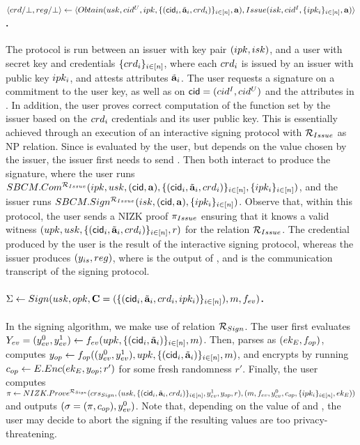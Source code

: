 \paragraph{$\langle crd/\bot,reg/\bot \rangle \gets
  \langle Obtain(usk,cid^U,ipk,\lbrace (\mathsf{cid}_i,\tilde{\mathbf{a}}_i,crd_i) \rbrace_{i\in[n]},
  \mathbf{a}),Issue(isk,cid^I,\lbrace ipk_i \rbrace_{i\in[n]},\mathbf{a})\rangle$.} %
The protocol is run between an issuer with key pair $(ipk,isk)$, and a user
with secret key \usk and credentials $\lbrace crd_i \rbrace_{i\in[n]}$, where
each $crd_i$ is issued by an issuer with public key $ipk_i$, and
attests attributes $\tilde{\mathbf{a}}_i$. The user requests a signature on a commitment to
the user key, as well as on $\mathsf{cid}=(cid^I,cid^U)$ and the attributes in \attrs.
In addition, the user proves correct computation of the \fissue function set by
the issuer based on the $crd_i$ credentials and its user public key.
This is essentially achieved through an execution of an \SBCM interactive
signing protocol with $\mathcal{R}_{Issue}$ as NP relation. Since \fissue is
evaluated by the user, but depends on the \cidi value chosen by the issuer, the
issuer first needs to send \cidi.
Then both interact to produce the \SBCM signature, where the
user runs $SBCM.Com^{\mathcal{R}_{Issue}}(ipk,usk,(\mathsf{cid},\mathbf{a}),\lbrace (\mathsf{cid}_i,
\tilde{\mathbf{a}}_i,crd_i)\rbrace_{i\in[n]},\lbrace ipk_i \rbrace_{i\in[n]})$, and the
issuer runs $SBCM.Sign^{\mathcal{R}_{Issue}}(isk,(\mathsf{cid},\mathbf{a}),\lbrace ipk_i
\rbrace_{i\in[n]})$. Observe that, within this protocol, the user sends a NIZK
proof $\pi_{Issue}$ ensuring that it knows a valid witness $(upk,usk,
\lbrace (\mathsf{cid}_i,\tilde{\mathbf{a}}_i,crd_i)\rbrace_{i \in [n]},r)$ for the relation
$\mathcal{R}_{Issue}$. The credential \cred produced by the user is the result of
the interactive signing protocol, whereas the issuer produces $(y_{is},
reg)$, where \yissue is the output of \fissue, and \utrans is the
communication transcript of the signing protocol.%

\paragraph{$\Sigma \gets Sign(usk,opk,
  \mathbf{C}=(\lbrace (\mathsf{cid}_i,\tilde{\mathbf{a}}_i,crd_i,ipk_i)\rbrace_{i\in[n]}),
  m,f_{ev})$.} %
In the signing algorithm, we make use of relation $\mathcal{R}_{Sign}$.
% 
The user first evaluates $Y_{ev} = (y_{ev}^0,y_{ev}^1) \gets f_{ev} (upk,
\lbrace(\mathsf{cid}_i,\tilde{\mathbf{a}}_i)\rbrace_{i\in[n]},m)$. Then, parses \opk as $(ek_{E},
f_{op})$, computes $y_{op} \gets f_{op}((y_{ev}^0,y_{ev}^1),upk,
\lbrace(\mathsf{cid}_i,\tilde{\mathbf{a}}_i)\rbrace_{i\in[n]},m)$, and encrypts
\yinsp by running $c_{op} \gets E.Enc(ek_{E},y_{op}; r')$ for some fresh
randomness $r'$. Finally, the user
computes $\pi \gets NIZK.Prove^{\mathcal{R}_{Sign}}(crs_{Sign},(usk,
\lbrace(\mathsf{cid}_i,\tilde{\mathbf{a}}_i,crd_i)\rbrace_{i\in[n]},y_{ev}^1,y_{op},r),(m,
f_{ev},y_{ev}^0,c_{op},\lbrace ipk_i\rbrace_{i\in[n]},ek_{E}))$ and outputs
$(\sigma = (\pi,c_{op}),y_{ev}^0)$. Note that, depending on the value of
\Yeval and \yinsp, the user may decide to abort
the signing if the resulting values are too privacy-threatening.

